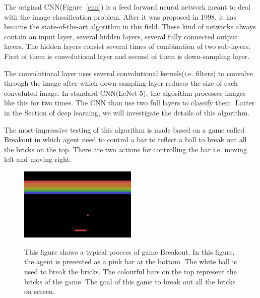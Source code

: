 \documentclass{article}
\begin{document}
The original CNN(Figure~\ref{cnn}) is a feed forward neural network meant to deal with the image classification problem. After it was proposed in 1998, it has became the state-of-the-art algorithm in this field.  These kind of networks always contain an input layer, several hidden layers, several fully connected output layers. The hidden layers consist several times of combination of two sub-layers. First of them is convolutional layer and second of them is  down-sampling layer.

The convolutional layer uses several convolutional kernels(i.e. filters) to convolve through the image after which down-sampling layer reduces the size of each convoluted image. In standard CNN(LeNet-5), the algorithm processes images like this for two times. The CNN than use two full layers to classify them. Latter in the Section of deep learning, we will investigate the details of this algorithm.

The most-impressive testing of this algorithm is made based on a game called Breakout\cite{mnih2013playing} in which agent need to control a bar to reflect a ball to break out all the bricks on the top. There are two actions for controlling the bar i.e. moving left and moving right.

\begin{figure}[h!]
\centering
{\includegraphics[width = 0.5\textwidth]{breakout}} 
\label{breakout}
\caption{This figure shows a typical process of game Breakout. In this figure, the agent is presented as a pink bar at the bottom. The white ball is used to break the bricks. The colourful bars on the top represent the bricks of the game. The goal of this game to break out all the bricks on screen. }
\end{figure}
\end{document}
